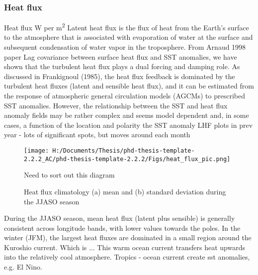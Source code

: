 \subsubsection{Heat flux}

Heat flux W per m\textsuperscript{2}
Latent heat flux is the flux of heat from the Earth's surface to the atmosphere that is associated with evaporation of water at the surface and subsequent condensation of water vapor in the troposphere. 
From Arnaud 1998 paper
Lag covariance between surface heat flux and SST anomalies, we have shown that the turbulent heat
flux plays a dual forcing and damping role. As discussed in Frankignoul (1985), the heat flux
feedback is dominated by the turbulent heat fluxes (latent and sensible heat flux), and it can be estimated from
the response of atmospheric general circulation models (AGCMs) to prescribed SST anomalies. However, the
relationship between the SST and heat flux anomaly fields may be rather complex and seems model dependent
and, in some cases, a function of the location and polarity the SST anomaly
LHF plots in prev year - lots of significant spots, but moves around each month

\begin{figure}[h]
	\centering
	\noindent\texttt{[image: H:/Documents/Thesis/phd-thesis-template-2.2.2\_AC/phd-thesis-template-2.2.2/Figs/heat\_flux\_pic.png]}
	\caption{Need to sort out this diagram}\label{fig:heat_flux}
\end{figure}



\begin{figure} %
	
	
	\caption{Heat flux climatology (a) mean and (b) standard deviation during the JJASO season}\label{fig:HF_climat}
\end{figure}


During the JJASO season, mean heat flux (latent plus sensible) is generally consistent across longitude bands, with lower values towards the poles. In the winter (JFM), the largest heat fluxes are dominated in a small region around the Kuroshio current. Which is ... This warm ocean current transfers heat upwards into the relatively cool atmosphere.
Tropics - ocean current create sst anomalies, e.g. El Nino.

